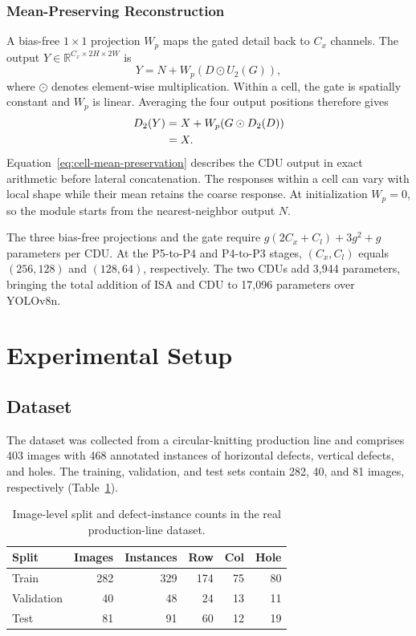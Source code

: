 \documentclass[lettersize,journal]{IEEEtran}
\begin{document}
\subsubsection{Mean-Preserving Reconstruction}
A bias-free $1\times1$ projection $W_p$ maps the gated detail back to $C_x$ channels. The output $Y\in\mathbb{R}^{C_x\times2H\times2W}$ is
\begin{equation}
Y=N+W_p\!\left(D\odot U_2(G)\right),
\label{eq:cell-output}
\end{equation}
\noindent where $\odot$ denotes element-wise multiplication. Within a cell, the gate is spatially constant and $W_p$ is linear. Averaging the four output positions therefore gives
\begin{align}
D_2(Y) &= X+W_p\!\left(G\odot D_2(D)\right)\notag\\
       &= X.
\label{eq:cell-mean-preservation}
\end{align}
\noindent Equation~\eqref{eq:cell-mean-preservation} describes the CDU output in exact arithmetic before lateral concatenation. The responses within a cell can vary with local shape while their mean retains the coarse response. At initialization $W_p=0$, so the module starts from the nearest-neighbor output $N$.

The three bias-free projections and the gate require $g(2C_x+C_l)+3g^2+g$ parameters per CDU. At the P5-to-P4 and P4-to-P3 stages, $(C_x,C_l)$ equals $(256,128)$ and $(128,64)$, respectively. The two CDUs add 3,944 parameters, bringing the total addition of ISA and CDU to 17,096 parameters over YOLOv8n.

\section{Experimental Setup}
\label{sec:experimental-setup}
\subsection{Dataset}
The dataset was collected from a circular-knitting production line and comprises 403 images with 468 annotated instances of horizontal defects, vertical defects, and holes. The training, validation, and test sets contain 282, 40, and 81 images, respectively (Table~\ref{tab:data}).
\begin{table}[!htbp]
\caption{Image-level split and defect-instance counts in the real production-line dataset.}
\label{tab:data}
\centering
\footnotesize
\begin{tabular}{lrrrrr}
\toprule
Split & Images & Instances & Row & Col & Hole \\
\midrule
Train & 282 & 329 & 174 & 75 & 80 \\
Validation & 40 & 48 & 24 & 13 & 11 \\
Test & 81 & 91 & 60 & 12 & 19 \\
\bottomrule
\end{tabular}
\end{table}
\end{document}
